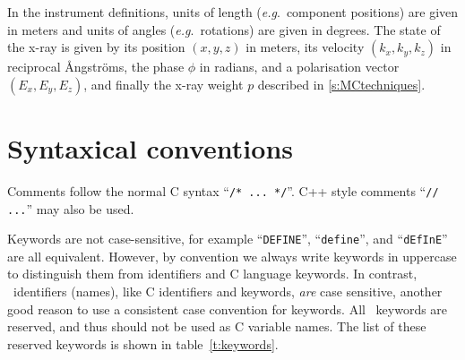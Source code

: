 In the instrument definitions, units of length (\textit{e.g}.\ component
positions) are given in meters and units of angles (\textit{e.g}.\
rotations) are given in degrees.  The state of the x-ray is given by
its position $(x,y,z)$ in meters, its velocity $(k_x, k_y, k_z)$ in
reciprocal Ångströms, the phase $\phi$ in radians, and a polarisation vector
$\left( E_x, E_y, E_z \right)$, and finally the x-ray weight $p$ described in \ref{s:MCtechniques}.

\section{Syntaxical conventions}
\label{s:syntax}

Comments follow the normal C syntax ``\verb+/* ... */+''. C++ style
comments ``\verb+// ...+'' may also be used.


Keywords are not case-sensitive, for example ``\verb+DEFINE+'',
``\verb+define+'', and ``\verb+dEfInE+'' are all equivalent. However, by
convention we always write keywords in uppercase to distinguish them
from identifiers and C language keywords. In contrast, \MCX\
identifiers (names), like C identifiers and keywords, \emph{are} case
sensitive, another good reason to use a consistent case convention for
keywords. All \MCX\ keywords are reserved, and thus should not be used
as C variable names. The list of these reserved keywords is shown in table~\ref{t:keywords}. 

